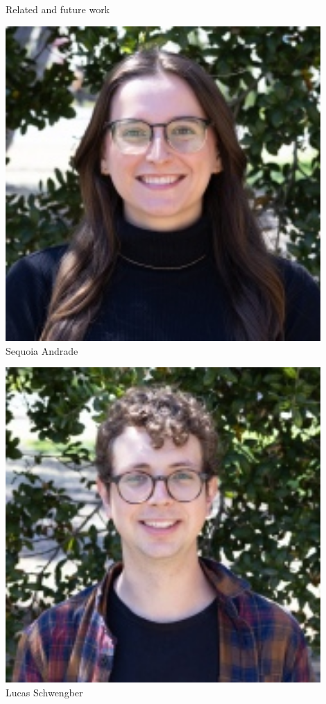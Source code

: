 \begin{frame}{Related and future work}
\begin{minipage}[t]{0.24\textwidth}
    \includegraphics[width=0.9\textwidth]{static_figures/sequoia.jpg}\\
    Sequoia Andrade
\end{minipage}
\begin{minipage}[t]{0.24\textwidth}
    \centering
\includegraphics[width=0.9\textwidth]{static_figures/lucas.jpg}\\
Lucas Schwengber
\end{minipage}

\end{frame}



